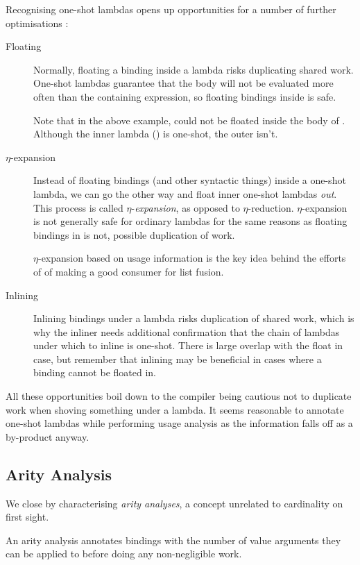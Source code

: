 Recognising one-shot lambdas opens up opportunities for a number of further optimisations \parencite[Section~6.6.2]{warnsbrough}:
\begin{description}
  \item[Floating]
    Normally, floating a  binding inside a lambda risks duplicating shared work.
    One-shot lambdas guarantee that the body will not be evaluated more often than the containing expression, so floating bindings inside is safe.

    Note that in the above example,  could not be floated inside the body of .
    Although the inner lambda () is one-shot, the outer isn't.
  \item[$\eta$-expansion]
    Instead of floating  bindings (and other syntactic things) inside a one-shot lambda, we can go the other way and float inner one-shot lambdas \emph{out}.
    This process is called $\eta$-\emph{expansion}, as opposed to $\eta$-reduction.
    $\eta$-expansion is not generally safe for ordinary lambdas for the same reasons as floating  bindings in is not, \eg possible duplication of work.

    $\eta$-expansion based on usage information is the key idea behind the efforts of \textcite{callarity} of making  a good consumer for list fusion.
  \item[Inlining]
    Inlining bindings under a lambda risks duplication of shared work, which is why the inliner needs additional confirmation that the chain of lambdas under which to inline is one-shot.
    There is large overlap with the float in case, but remember that inlining may be beneficial in cases where a binding cannot be floated in.
\end{description}

All these opportunities boil down to the compiler being cautious not to duplicate work when shoving something under a lambda.
It seems reasonable to annotate one-shot lambdas while performing usage analysis as the information falls off as a by-product anyway.

\subsection{Arity Analysis}\label{sec:arity}

We close by characterising \emph{arity analyses}, a concept unrelated to cardinality on first sight.

An arity analysis annotates bindings with the number of value arguments they can be applied to before doing any non-negligible work.

